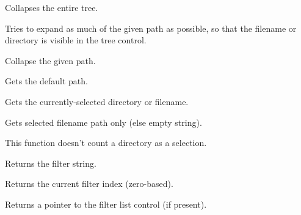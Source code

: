 Collapses the entire tree.

\label{wxgenericdirctrlexpandpath}


Tries to expand as much of the given path as possible, so that the filename or directory is visible in the tree control.

\label{wxgenericdirctrlcollapsepath}


Collapse the given path.

\label{wxgenericdirctrlgetdefaultpath}


Gets the default path.

\label{wxgenericdirctrlgetpath}


Gets the currently-selected directory or filename.

\label{wxgenericdirctrlgetfilepath}


Gets selected filename path only (else empty string).

This function doesn't count a directory as a selection.

\label{wxgenericdirctrlgetfilter}


Returns the filter string.

\label{wxgenericdirctrlgetfilterindex}


Returns the current filter index (zero-based).

\label{wxgenericdirctrlgetfilterlistctrl}


Returns a pointer to the filter list control (if present).

\label{wxgenericdirctrlgetrootid}


